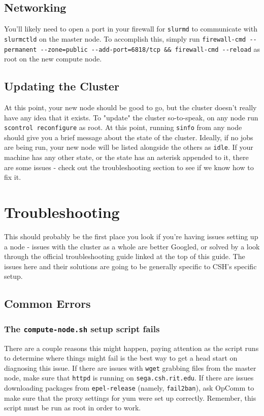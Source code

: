 \documentclass[a4paper]{article}
\begin{document}
\subsection{Networking}
You'll likely need to open a port in your firewall for \texttt{slurmd} to communicate with \texttt{slurmctld} on the master node.
To accomplish this, simply run \texttt{firewall-cmd -{}-permanent -{}-zone=public -{}-add-port=6818/tcp \&\& firewall-cmd -{}-reload} as root on the new compute node.

\subsection{Updating the Cluster}
At this point, your new node should be good to go, but the cluster doesn't really have any idea that it exists.
To "update" the cluster so-to-speak, on any node run \texttt{scontrol reconfigure} as root.
At this point, running \texttt{sinfo} from any node should give you a brief message about the state of the cluster.
Ideally, if no jobs are being run, your new node will be listed alongside the others as \texttt{idle}.
If your machine has any other state, or the state has an asterisk appended to it, there are some issues - check out the troubleshooting section to see if we know how to fix it.

\section{Troubleshooting}

This should probably be the first place you look if you're having issues setting up a node - issues with the cluster as a whole are better Googled, or solved by a look through the official troubleshooting guide linked at the top of this guide.
The issues here and their solutions are going to be generally specific to CSH's specific setup.

\subsection{Common Errors}

\subsubsection*{The \texttt{compute-node.sh} setup script fails}
There are a couple reasons this might happen, paying attention as the script runs to determine where things might fail is the best way to get a head start on diagnosing this issue.
If there are issues with \texttt{wget} grabbing files from the master node, make sure that \texttt{httpd} is running on \texttt{sega.csh.rit.edu}.
If there are issues downloading packages from \texttt{epel-release} (namely, \texttt{fail2ban}), ask OpComm to make sure that the proxy settings for yum were set up correctly. Remember, this script must be run as root in order to work.
\end{document}
